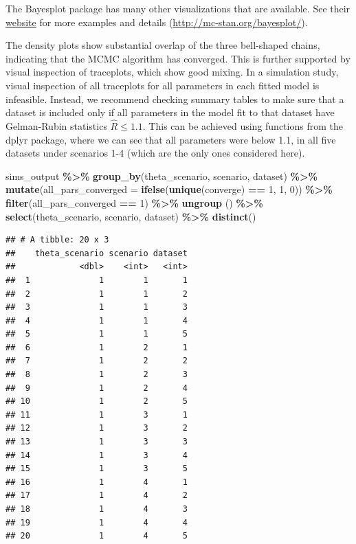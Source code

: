 \documentclass[
]{article}
\newenvironment{Shaded}{\begin{snugshade}}{\end{snugshade}}
\newcommand{\AttributeTok}[1]{\textcolor[rgb]{0.13,0.29,0.53}{#1}}
\newcommand{\DecValTok}[1]{\textcolor[rgb]{0.00,0.00,0.81}{#1}}
\newcommand{\FunctionTok}[1]{\textcolor[rgb]{0.13,0.29,0.53}{\textbf{#1}}}
\newcommand{\NormalTok}[1]{#1}
\newcommand{\SpecialCharTok}[1]{\textcolor[rgb]{0.81,0.36,0.00}{\textbf{#1}}}
\begin{document}
\linespread{1}

The Bayesplot package has many other visualizations that are available. See their \href{http://mc-stan.org/bayesplot/}{website} for more examples and details (\url{http://mc-stan.org/bayesplot/}).

The density plots show substantial overlap of the three bell-shaped chains, indicating that the MCMC algorithm has converged. This is further supported by visual inspection of traceplots, which show good mixing. In a simulation study, visual inspection of all traceplots for all parameters in each fitted model is infeasible. Instead, we recommend checking summary tables to make sure that a dataset is included only if all parameters in the model fit to that dataset have Gelman-Rubin statistics \(\hat{R} \leq 1.1.\) This can be achieved using functions from the dplyr package, where we can see that all parameters were below 1.1, in all five datasets under scenarios 1-4 (which are the only ones considered here).

\linespread{1}

\linespread{1}

\linespread{1}

\begin{Shaded}
\begin{Highlighting}[]
\NormalTok{sims\_output }\SpecialCharTok{\%\textgreater{}\%} 
  \FunctionTok{group\_by}\NormalTok{(theta\_scenario, scenario, dataset) }\SpecialCharTok{\%\textgreater{}\%} 
  \FunctionTok{mutate}\NormalTok{(}\AttributeTok{all\_pars\_converged =} \FunctionTok{ifelse}\NormalTok{(}\FunctionTok{unique}\NormalTok{(converge) }\SpecialCharTok{==} \DecValTok{1}\NormalTok{, }\DecValTok{1}\NormalTok{, }\DecValTok{0}\NormalTok{)) }\SpecialCharTok{\%\textgreater{}\%} 
  \FunctionTok{filter}\NormalTok{(all\_pars\_converged }\SpecialCharTok{==} \DecValTok{1}\NormalTok{) }\SpecialCharTok{\%\textgreater{}\%} 
  \FunctionTok{ungroup}\NormalTok{ () }\SpecialCharTok{\%\textgreater{}\%} 
  \FunctionTok{select}\NormalTok{(theta\_scenario, scenario, dataset) }\SpecialCharTok{\%\textgreater{}\%} 
  \FunctionTok{distinct}\NormalTok{()}
\end{Highlighting}
\end{Shaded}

\begin{verbatim}
## # A tibble: 20 x 3
##    theta_scenario scenario dataset
##             <dbl>    <int>   <int>
##  1              1        1       1
##  2              1        1       2
##  3              1        1       3
##  4              1        1       4
##  5              1        1       5
##  6              1        2       1
##  7              1        2       2
##  8              1        2       3
##  9              1        2       4
## 10              1        2       5
## 11              1        3       1
## 12              1        3       2
## 13              1        3       3
## 14              1        3       4
## 15              1        3       5
## 16              1        4       1
## 17              1        4       2
## 18              1        4       3
## 19              1        4       4
## 20              1        4       5
\end{verbatim}
\end{document}
